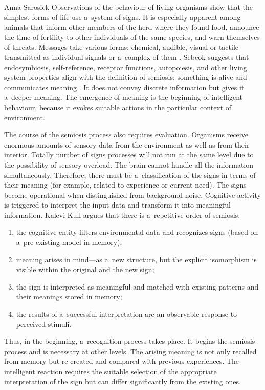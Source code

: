 \begin{artengenv}{Anna Sarosiek}
Observations of the behaviour of living organisms show that the simplest forms of life use a~system of signs. It is especially apparent among animals that inform other members of the herd where they found food, announce the time of fertility to other individuals of the same species, and warn themselves of threats. Messages take various forms: chemical, audible, visual or tactile transmitted as individual signals or a~complex of them
\parencite[][]{sebeok_semiotics_1969}. %
 Sebeok suggests that endosymbiosis, self-reference, receptor functions, autopoiesis, and other living system properties align with the definition of semiosis: something is alive and communicates meaning 
\parencite[][p.72]{sebeok_animal_1988}. %
 It does not convey discrete information but gives it a~deeper meaning. The emergence of meaning is the beginning of intelligent behaviour, because it evokes suitable actions in the particular context of environment.

The course of the semiosis process also requires evaluation. Organisms receive enormous amounts of sensory data from the environment as well as from their interior. Totally number of signs processes will not run at the same level due to the possibility of sensory overload. The brain cannot handle all the information simultaneously. Therefore, there must be a~classification of the signs in terms of their meaning (for example, related to experience or current need). The signs become operational when distinguished from background noise. Cognitive activity is triggered to interpret the input data and transform it into meaningful information. Kalevi Kull
\parencite*[][]{kull_semiosis_1998} %
 argues that there is a~repetitive order of semiosis:

\begin{enumerate}
\item the cognitive entity filters environmental data and recognizes signs (based on a~pre-existing model in memory);
\item meaning arises in mind---as a~new structure, but the explicit isomorphism is visible within the original and the new sign;
\item the sign is interpreted as meaningful and matched with existing patterns and their meanings stored in memory;
\item the results of a~successful interpretation are an observable response to perceived stimuli.
\end{enumerate}
Thus, in the beginning, a~recognition process takes place. It begins the semiosis process and is necessary at other levels. The arising meaning is not only recalled from memory but re-created and compared with previous experiences. The intelligent reaction requires the suitable selection of the appropriate interpretation of the sign but can differ significantly from the existing ones.


\end{artengenv}
